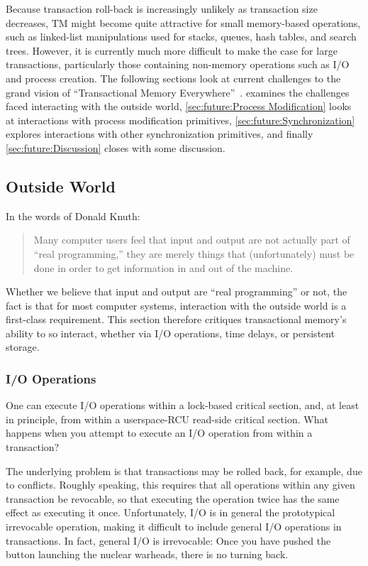 Because transaction roll-back is increasingly unlikely as transaction
size decreases, TM might become quite attractive for small memory-based
operations,
such as linked-list manipulations used for stacks, queues, hash tables,
and search trees.
However, it is currently much more difficult to make the case for large
transactions, particularly those containing non-memory operations such
as I/O and process creation.
The following sections look at current challenges to the grand vision of
``Transactional Memory Everywhere''~\cite{PaulEMcKenney2009TMeverywhere}.
 examines the challenges faced
interacting with the outside world,
\cref{sec:future:Process Modification} looks at interactions
with process modification primitives,
\cref{sec:future:Synchronization} explores interactions with
other synchronization primitives, and finally
\cref{sec:future:Discussion} closes with some discussion.

\subsection{Outside World}
\label{sec:future:Outside World}

In the words of Donald Knuth:

\begin{quote}
	Many computer users feel that input and output are not actually part
	of ``real programming,'' they are merely things that (unfortunately)
	must be done in order to get information in and out of the machine.
\end{quote}

Whether we believe that input and output are ``real programming'' or
not, the fact is that for most computer systems, interaction with the
outside world is a first-class requirement.
This section therefore critiques transactional memory's ability to
so interact, whether via I/O operations, time delays, or persistent
storage.

\subsubsection{I/O Operations}
\label{sec:future:I/O Operations}

One can execute I/O operations within a lock-based critical section,
and, at least in principle, from within a userspace-RCU read-side
critical section.
What happens when you attempt to execute an I/O operation from within
a transaction?

The underlying problem is that transactions may be rolled back, for
example, due to conflicts.
Roughly speaking, this requires that all operations within any given
transaction be revocable, so that executing the operation twice has
the same effect as executing it once.
Unfortunately, I/O is in general the prototypical irrevocable
operation, making it difficult to include general I/O operations in
transactions.
In fact, general I/O is irrevocable:
Once you have pushed the button launching the nuclear warheads, there
is no turning back.

